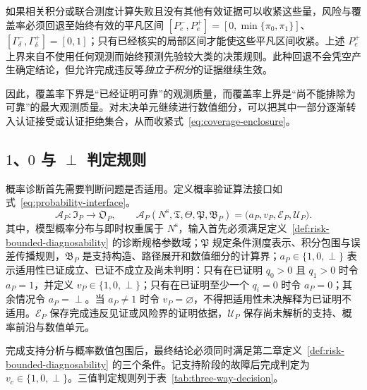 \documentclass[master,fontset=ubuntu]{shnuthesis}
\DeclareRobustCommand{\probstatus}[1]{\ensuremath{#1}}
\theoremstyle{definition}
\begin{document}
如果相关积分或联合测度计算失败且没有其他有效证据可以收紧这些量，风险与覆盖率必须回退至始终有效的平凡区间 $[P_e^-,P_e^+]=[0,\min\{\pi_0,\pi_1\}]$、$[\Gamma_\delta^-,\Gamma_\delta^+]=[0,1]$；只有已经核实的局部区间才能使这些平凡区间收紧。上述 $P_e^+$ 上界来自不使用任何观测而始终预测先验较大类的决策规则。此种回退不会凭空产生确定结论，但允许完成违反等\emph{独立于积分}的证据继续生效。

因此，覆盖率下界是“已经证明可靠”的观测质量，而覆盖率上界是“尚不能排除为可靠”的最大观测质量。对未决单元继续进行数值细分，可以把其中一部分逐渐转入认证接受或认证拒绝集合，从而收紧式~\eqref{eq:coverage-enclosure}。

\subsection{\probstatus{1}、\probstatus{0} 与 \probstatus{\perp} 判定规则}

概率诊断首先需要判断问题是否适用。定义概率验证算法接口如式~\eqref{eq:probability-interface}。
\begin{equation}
\mathcal A_P:\mathfrak I_P\rightarrow\mathfrak O_P,
\qquad
\mathcal A_P(N^{\mathrm s},\mathfrak T,\Theta,\mathfrak P,\mathfrak B_P)
=\bigl(a_P,v_P,\mathcal E_P,\mathcal U_P\bigr).
\label{eq:probability-interface}
\end{equation}
其中，模型概率分布与即时权重属于 \(N^{\mathrm s}\)，输入首先必须满足定义~\ref{def:risk-bounded-diagnosability} 的诊断规格参数域；\(\mathfrak P\) 规定条件测度表示、积分包围与误差传播规则，\(\mathfrak B_P\) 是支持构造、路径展开和数值细分的计算界；\(a_P\in\{1,0,\perp\}\) 表示适用性已证成立、已证不成立及尚未判明：只有在已证明 \(q_0>0\) 且 \(q_1>0\) 时令 \(a_P=1\)，并定义 \(v_P\in\{1,0,\perp\}\)；只有在已证明至少一个 \(q_i=0\) 时令 \(a_P=0\)；其余情况令 \(a_P=\perp\)。当 \(a_P\neq1\) 时令 \(v_P=\varnothing\)，不得把适用性未决解释为已证明不适用。\(\mathcal E_P\) 保存完成违反见证或风险界的证明依据，\(\mathcal U_P\) 保存尚未解析的支持、概率前沿与数值单元。

完成支持分析与概率数值包围后，最终结论必须同时满足第二章定义~\ref{def:risk-bounded-diagnosability} 的三个条件。记支持阶段的故障后完成判定为 \(v_c\in\{1,0,\perp\}\)。三值判定规则列于表~\ref{tab:three-way-decision}。
\end{document}

